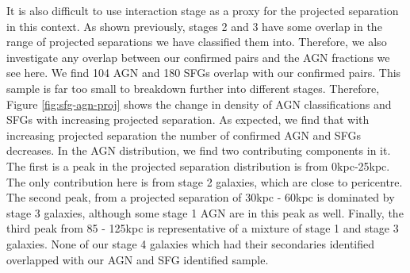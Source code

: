 It is also difficult to use interaction stage as a proxy for the projected separation in this context. As shown previously, stages 2 and 3 have some overlap in the range of projected separations we have classified them into. Therefore, we also investigate any overlap between our confirmed pairs and the AGN fractions we see here. We find 104 AGN and 180 SFGs overlap with our confirmed pairs. This sample is far too small to breakdown further into different stages. Therefore, Figure \ref{fig:sfg-agn-proj} shows the change in density of AGN classifications and SFGs with increasing projected separation. As expected, we find that with increasing projected separation the number of confirmed AGN and SFGs decreases. In the AGN distribution, we find two contributing components in it. The first is a peak in the projected separation distribution is from 0kpc-25kpc. The only contribution here is from stage 2 galaxies, which are close to pericentre. The second peak, from a projected separation of 30kpc - 60kpc is dominated by stage 3 galaxies, although some stage 1 AGN are in this peak as well. Finally, the third peak from 85 - 125kpc is representative of a mixture of stage 1 and stage 3 galaxies. None of our stage 4 galaxies which had their secondaries identified overlapped with our AGN and SFG identified sample.

